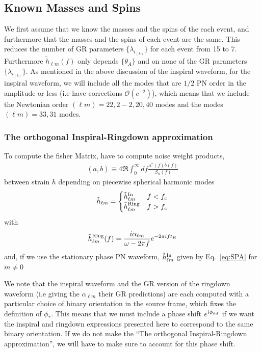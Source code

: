 \documentclass[aps,prd,amsmath,showpacs,amssymb,superscriptaddress,nofootinbib,longbibliography,eqsecnum,preprintnumbers]{revtex4-1}
\begin{document}
\subsection{Known Masses and Spins}
We first assume that we know the masses and the spins of the each event, and furthermore that the masses and the spins of each event are the same. This reduces the number of GR parameters $\{\lambda_{i_{(k)}}\}$ for each event from 15 to 7. Furthermore $\tilde h_{\ell m}(f)$ only depends $\{\theta_{A}\}$ and on none of the GR parameters $\{\lambda_{i_{(k)}}\}$. As mentioned in the above discussion of the inspiral waveform, for the inspiral waveform, we will include all the modes that are $1/2$ PN order in the amplitude or less (i.e have corrections $\mathcal{O}(c^{-2})$), which means that we include the Newtonian order $(\ell m)=22, 2-2, 20, 40$ modes and the modes $(\ell m)=33, 31$ modes.

\subsubsection{The orthogonal Inspiral-Ringdown approximation}
To compute the fisher Matrix, have to compute noise weight products, 
\begin{align}
(a,b)\equiv 4\Re\int_0^\infty df\frac{a^*(f)b(f)}{S_n(f)}
\end{align}
between strain $h$ depending on piecewise spherical harmonic modes
\begin{align}
\tilde h_{\ell m}=
\begin{cases}
\tilde h_{\ell m}^{\rm In} &f<f_c \\
\tilde h_{\ell m}^{\rm Ring} &f>f_c
\end{cases}
\end{align}
with 
\begin{align}
\tilde h^{\rm Ring}_{\ell m}(f)=\frac{i\alpha_{\ell m}}{\omega -2\pi f}e^{-2\pi i ft_R}
\end{align}
and, if we use the stationary phase PN waveform, $\tilde h_{\ell m}^{\rm In}$ given by Eq.~\eqref{eq:SPA} for $m\neq 0$

We note that the inspiral waveform and the GR version  of the ringdown  waveform (i.e giving the $\alpha_{\ell m}$ their GR predictions) are each computed with a particular choice of binary orientation in the source frame, which fixes the definition of $\phi_*$. This means that we must include a phase shift $e^{i\phi_{\rm dif}}$ if we want the inspiral and ringdown expressions presented here to correspond to the same binary orientation. If we do not make the ``The orthogonal Inspiral-Ringdown approximation'', we will have to make sure to account for this phase shift.
\end{document}
